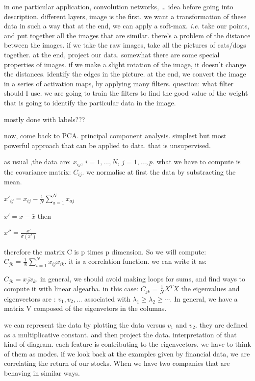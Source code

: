 \documentclass[a4paper]{tufte-book}
\newcommand{\hairsp}{\hspace{1pt}}%
\newcommand{\ie}{\textit{i.\hairsp{}e.}\xspace}
\newcommand{\nth}{\frac{1}{N}}
\newcommand{\sumin}{\sum_{i=1}^N}
\begin{document}
in one particular application, convolution networks, \dots
idea before going into description.
different layers, image is the first.
we want a transformation of these data in such a way that at the end, we can
apply a soft-max. \ie take our points, and put together all the images that are similar. there's a problem of the distance between the images. if we
take the raw images, take all the pictures of cats/dogs together.
at the end, project our data.
somewhat there are some special properties of images. if we make a slight 
rotation of the image, it doesn't change the distances.
identify the edges in the picture.
at the end, we convert the image in a series of activation maps, by applying
many filters. question: what filter should I use.
we are going to train the filters to find the good value of the weight that
is going to identify the particular data in the image.



mostly done with labels???


now, come back to PCA.
principal component analysis. simplest but most powerful approach that can be
applied to data.
that is unsupervised.

as usual ,the data are:
$x_{ij}$, $i = 1, \ldots, N$, $j=1,\ldots, p$.
what we have to compute is the covariance matrix:
$C_{ij}$. we normalise at first the data by substracting the mean.

$x'_{ij} = x_{ij} - \nth \sum_{a=1}^N x_{aj}$

$x' = x - \bar{x}$
then

$x'' = \frac{x'}{\sigma(x')}$

therefore the matrix C is p times p dimension.
So we will compute:
$C_{jk} = \nth \sumin x_{ij} x_{ik}$. it is a correlation function.
we can write it as:

$C_{jk} = \overline{x_j x_k}$.
in general, we should avoid making loops for sums, and find ways to compute it
with linear algearba. in this case:
$C_{jk} = \nth X^TX$
the eigenvalues and eigenvectors are :
$v_1, v_2, \ldots$ associated with $\lambda_1 \geq \lambda_2 \geq \cdots$.
In general, we have a matrix V composed of the eigenvetors in the columns.

we can represent the data by plotting the data versus $v_1$ and $v_2$.
they are defined as a multiplicative constant. and then project the data.
interpretation of that kind of diagram.
each feature is contributing to the eigenvectors. we have to think of them as
modes.
if we look back at the examples given by financial data, we are correlating the return of our stocks. When we have two companies that are behaving in
similar ways.
\end{document}
